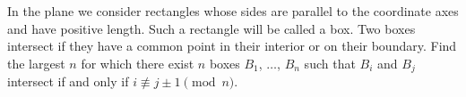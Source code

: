 In the plane we consider rectangles whose sides are parallel to the coordinate axes and have positive length. Such a rectangle will be called a box. Two boxes intersect if they have a common point in their interior or on their boundary. Find the largest $ n$ for which there exist $ n$ boxes $ B_1$,  $ \ldots$,  $ B_n$ such that $ B_i$ and $ B_j$ intersect if and only if $ i\not\equiv j\pm 1\pmod n$.